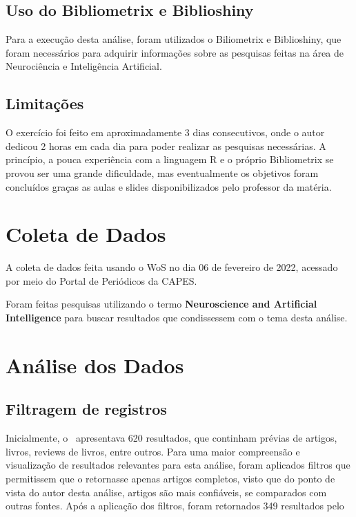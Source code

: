 \subsection{Uso do Bibliometrix e Biblioshiny}

Para a execução desta análise, foram utilizados o Biliometrix e Biblioshiny, que foram necessários para adquirir informações sobre as pesquisas feitas na área de Neurociência e Inteligência Artificial.

\subsection{Limitações}

O exercício foi feito em aproximadamente 3 dias consecutivos, onde o autor dedicou 2 horas em cada dia para poder realizar as pesquisas necessárias. A princípio, a pouca experiência com a linguagem R e o próprio Bibliometrix se provou ser uma grande dificuldade, mas eventualmente os objetivos foram concluídos graças as aulas e slides disponibilizados pelo professor da matéria.

\section{Coleta de Dados}

A coleta de dados feita usando o WoS no dia 06 de fevereiro de 2022, acessado por meio do Portal de Periódicos da CAPES.

Foram feitas pesquisas utilizando o termo \textbf{Neuroscience and Artificial Intelligence} para buscar resultados que condissessem com o tema desta análise.

\section{Análise dos Dados}

\subsection{Filtragem de registros}

Inicialmente, o \dataset\ apresentava 620 resultados, que continham prévias de artigos, livros, reviews de livros, entre outros. Para uma maior compreensão e visualização de resultados relevantes para esta análise, foram aplicados filtros que permitissem que o \dataset retornasse apenas artigos completos, visto que do ponto de vista do autor desta análise, artigos são mais confiáveis, se comparados com outras fontes. Após a aplicação dos filtros, foram retornados 349 resultados pelo \dataset 

